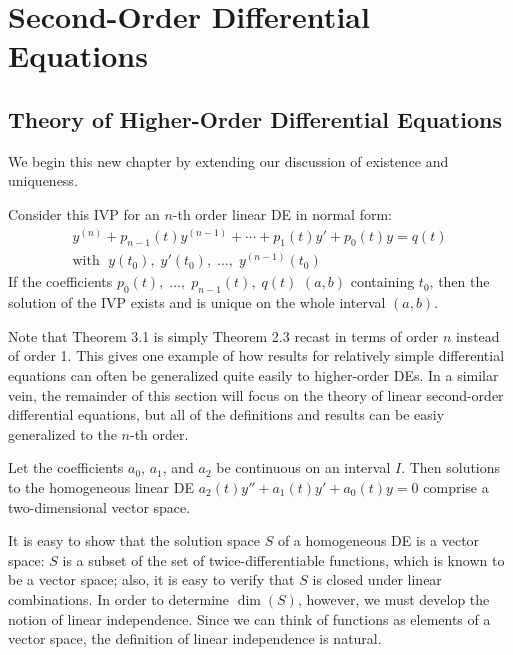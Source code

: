 \documentclass[../m082main.tex]{subfiles}
\begin{document}
\chapter{Second-Order Differential Equations}

\section{Theory of Higher-Order Differential Equations}
We begin this new chapter by extending our discussion of existence and uniqueness.

\begin{theorem}
    Consider this IVP for an $n$-th order linear DE in normal form:
    \begin{gather*}
        y^{(n)} + p_{n-1}(t)y^{(n-1)} + \cdots + p_1(t)y' + p_0(t)y = q(t) \\
        \text{with }\; y(t_0),\; y'(t_0),\; \ldots,\; y^{(n-1)}(t_0)
    \end{gather*}
    If the coefficients $p_0(t),\; \ldots,\; p_{n-1}(t),\; q(t)$  $(a, b)$ containing $t_0$, then the solution of the IVP exists and is unique on the whole interval $(a, b)$.
\end{theorem}

Note that Theorem 3.1 is simply Theorem 2.3 recast in terms of order $n$ instead of order 1.
This gives one example of how results for relatively simple differential equations can often be generalized quite easily to higher-order DEs.
In a similar vein, the remainder of this section will focus on the theory of linear second-order differential equations, but all of the definitions and results can be easiy generalized to the $n$-th order.

\begin{theorem}
    Let the coefficients $a_0$, $a_1$, and $a_2$ be continuous on an interval $I$.
    Then solutions to the homogeneous linear DE $a_2(t)y'' + a_1(t)y' + a_0(t)y = 0$ comprise a two-dimensional vector space.
\end{theorem}

It is easy to show that the solution space $S$ of a homogeneous DE is a vector space: $S$ is a subset of the set of twice-differentiable functions, which is known to be a vector space; also, it is easy to verify that $S$ is closed under linear combinations.
In order to determine $\dim (S)$, however, we must develop the notion of linear independence.
Since we can think of functions as elements of a vector space, the definition of linear independence is natural.
\end{document}
